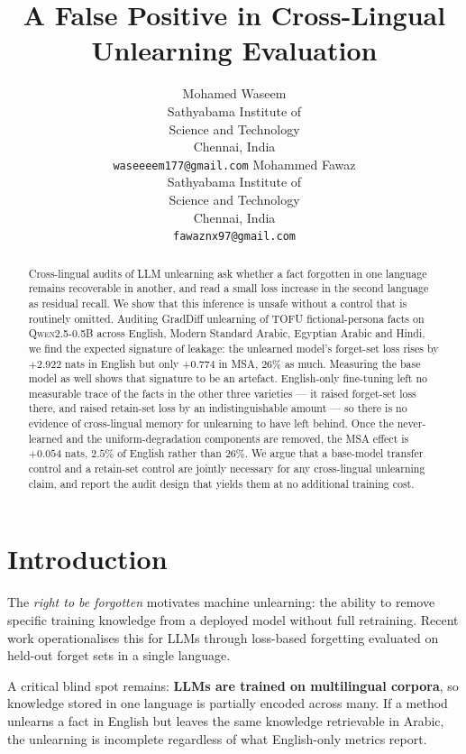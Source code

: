 \documentclass[11pt]{article}
\title{A False Positive in Cross-Lingual\\
Unlearning Evaluation}
\author{
  Mohamed Waseem \\
  Sathyabama Institute of \\ Science and Technology \\
  Chennai, India \\
  \texttt{waseeeem177@gmail.com}
  \And
  Mohammed Fawaz \\
  Sathyabama Institute of \\ Science and Technology \\
  Chennai, India \\
  \texttt{fawaznx97@gmail.com}
}
\begin{document}
\maketitle

\begin{abstract}
Cross-lingual audits of LLM unlearning ask whether a fact forgotten in one
language remains recoverable in another, and read a small loss increase in
the second language as residual recall.
We show that this inference is unsafe without a control that is routinely
omitted.
Auditing GradDiff unlearning of TOFU fictional-persona facts on
\textsc{Qwen2.5-0.5B} across English, Modern Standard Arabic, Egyptian
Arabic and Hindi, we find the expected signature of leakage: the unlearned
model's forget-set loss rises by $+2.922$ nats in English but only $+0.774$
in MSA, $26\%$ as much.
Measuring the base model as well shows that signature to be an artefact.
English-only fine-tuning left no measurable trace of the facts in the other
three varieties — it raised forget-set loss there, and raised retain-set loss
by an indistinguishable amount — so there is no evidence of cross-lingual
memory for unlearning to have left behind.
Once the never-learned and the uniform-degradation components are removed,
the MSA effect is $+0.054$ nats, $2.5\%$ of English rather than $26\%$.
We argue that a base-model transfer control and a retain-set control are
jointly necessary for any cross-lingual unlearning claim, and report the
audit design that yields them at no additional training cost.
\end{abstract}

\section{Introduction}
\label{sec:intro}

The \emph{right to be forgotten} \citep{cao2015towards} motivates machine
unlearning: the ability to remove specific training knowledge from a
deployed model without full retraining.
Recent work operationalises this for LLMs through loss-based
forgetting \citep{yao2023llmunlearning,zhang2024npo} evaluated on
held-out forget sets in a single language.

A critical blind spot remains: \textbf{LLMs are trained on multilingual
corpora}, so knowledge stored in one language is partially encoded across
many.
If a method unlearns a fact in English but leaves the same knowledge
retrievable in Arabic, the unlearning is incomplete regardless of what
English-only metrics report.
\end{document}
